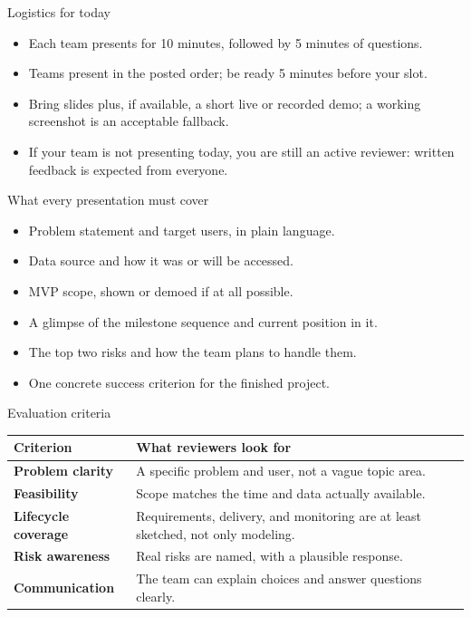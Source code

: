 \begin{frame}{Logistics for today}
\begin{itemize}
\item Each team presents for 10 minutes, followed by 5 minutes of questions.
\item Teams present in the posted order; be ready 5 minutes before your slot.
\item Bring slides plus, if available, a short live or recorded demo; a working screenshot is an acceptable fallback.
\item If your team is not presenting today, you are still an active reviewer: written feedback is expected from everyone.
\end{itemize}
\coursefooter
\end{frame}

\begin{frame}{What every presentation must cover}
\begin{itemize}
\item Problem statement and target users, in plain language.
\item Data source and how it was or will be accessed.
\item MVP scope, shown or demoed if at all possible.
\item A glimpse of the milestone sequence and current position in it.
\item The top two risks and how the team plans to handle them.
\item One concrete success criterion for the finished project.
\end{itemize}
\coursefooter
\end{frame}

\begin{frame}{Evaluation criteria}
\begin{tabularx}{\textwidth}{>{\bfseries}l X}
Criterion & What reviewers look for \\
\toprule
Problem clarity & A specific problem and user, not a vague topic area. \\
Feasibility & Scope matches the time and data actually available. \\
Lifecycle coverage & Requirements, delivery, and monitoring are at least sketched, not only modeling. \\
Risk awareness & Real risks are named, with a plausible response. \\
Communication & The team can explain choices and answer questions clearly. \\
\bottomrule
\end{tabularx}
\coursefooter
\end{frame}

